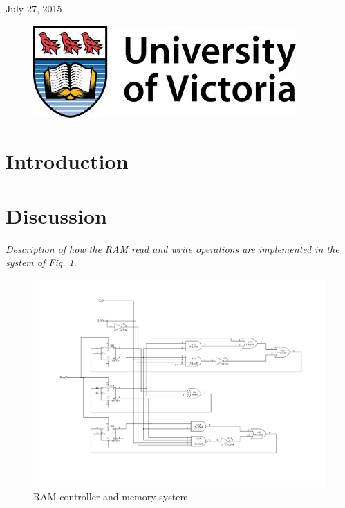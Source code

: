 \documentclass[11pt]{article}
\begin{document}
\begin{titlepage}
{\large July 27, 2015}\\ %

\begin{figure}[b]	 %
	\centering
	\includegraphics[scale=0.3]{UVic_logo}
\end{figure}

\end{titlepage}


\section{Introduction}


\section{Discussion}\label{sec:discussion}

{\em Description of how the RAM read and write operations are implemented in the system of Fig. 1.}

\begin{figure}[htpb]
	\centering
	\includegraphics[scale=0.5]{controller}
	\caption{RAM controller and memory system}
	\label{fig:controller}
\end{figure}
\end{document}
